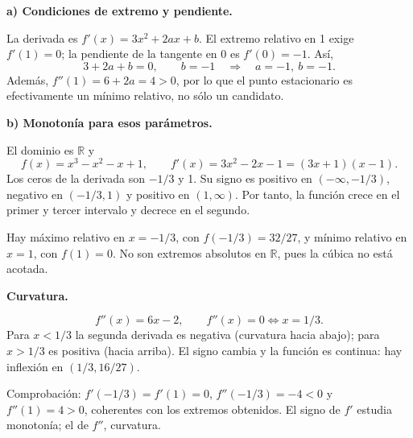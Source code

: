 \textbf{a) Condiciones de extremo y pendiente.}\par\nopagebreak[4]
La derivada es $f'(x)=3x^2+2ax+b$. El extremo relativo en 1 exige $f'(1)=0$; la pendiente de la tangente en 0 es $f'(0)=-1$. Así,
\[
3+2a+b=0,\qquad b=-1\quad\Longrightarrow\quad\boxed{a=-1,\ b=-1}.
\]
Además, $f''(1)=6+2a=4>0$, por lo que el punto estacionario es efectivamente un mínimo relativo, no sólo un candidato.

\textbf{b) Monotonía para esos parámetros.}\par\nopagebreak[4]
El dominio es $\mathbb R$ y
\[
f(x)=x^3-x^2-x+1,\qquad f'(x)=3x^2-2x-1=(3x+1)(x-1).
\]
Los ceros de la derivada son $-1/3$ y 1. Su signo es positivo en $(-\infty,-1/3)$, negativo en $(-1/3,1)$ y positivo en $(1,\infty)$. Por tanto, la función crece en el primer y tercer intervalo y decrece en el segundo.

Hay máximo relativo en $x=-1/3$, con $f(-1/3)=32/27$, y mínimo relativo en $x=1$, con $f(1)=0$. No son extremos absolutos en $\mathbb R$, pues la cúbica no está acotada.

\textbf{Curvatura.}\par\nopagebreak[4]
\[
f''(x)=6x-2,\qquad f''(x)=0\iff x=1/3.
\]
Para $x<1/3$ la segunda derivada es negativa (curvatura hacia abajo); para $x>1/3$ es positiva (hacia arriba). El signo cambia y la función es continua: hay inflexión en $(1/3,16/27)$.

Comprobación: $f'(-1/3)=f'(1)=0$, $f''(-1/3)=-4<0$ y $f''(1)=4>0$, coherentes con los extremos obtenidos. El signo de $f'$ estudia monotonía; el de $f''$, curvatura.
